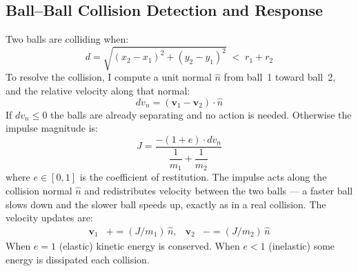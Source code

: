 \documentclass[12pt, letterpaper]{article}
\begin{document}
\subsection*{Ball--Ball Collision Detection and Response}
Two balls are colliding when:
\begin{equation}
  d = \sqrt{(x_2-x_1)^2 + (y_2-y_1)^2} \;<\; r_1 + r_2
\end{equation}
To resolve the collision, I compute a unit normal $\hat{n}$ from
ball~1 toward ball~2, and the relative velocity along that normal:
\begin{equation}
  dv_n = (\mathbf{v}_1 - \mathbf{v}_2)\cdot\hat{n}
\end{equation}
If $dv_n \leq 0$ the balls are already separating and no action is
needed.
Otherwise the impulse magnitude is:
\begin{equation}
  J = \frac{-(1+e)\cdot dv_n}{\dfrac{1}{m_1}+\dfrac{1}{m_2}}
  \label{eq:impulse}
\end{equation}
where $e \in [0,1]$ is the coefficient of restitution.
The impulse acts along the collision normal $\hat{n}$ and
redistributes velocity between the two balls ---
a faster ball slows down and the slower ball speeds up,
exactly as in a real collision.
The velocity updates are:
\begin{align}
  \mathbf{v}_1 &\mathrel{+}= (J/m_1)\,\hat{n}, &
  \mathbf{v}_2 &\mathrel{-}= (J/m_2)\,\hat{n}
\end{align}
When $e=1$ (elastic) kinetic energy is conserved.
When $e<1$ (inelastic) some energy is dissipated each collision.
\end{document}
